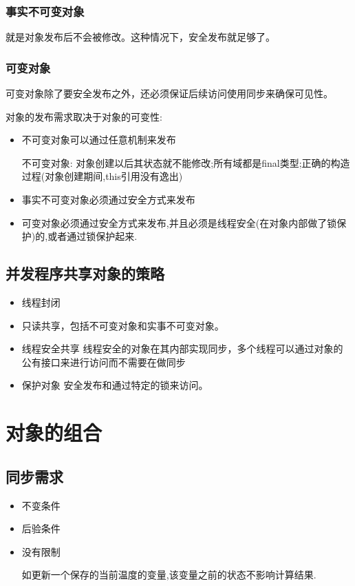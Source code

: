 \subsubsection{事实不可变对象}
就是对象发布后不会被修改。这种情况下，安全发布就足够了。

\subsubsection{可变对象}

可变对象除了要安全发布之外，还必须保证后续访问使用同步来确保可见性。

对象的发布需求取决于对象的可变性:
\begin{itemize}
\item 不可变对象可以通过任意机制来发布

不可变对象: 对象创建以后其状态就不能修改;所有域都是final类型;正确的构造过程(对象创建期间,this引用没有逸出)

\item 事实不可变对象必须通过安全方式来发布

\item 可变对象必须通过安全方式来发布,并且必须是线程安全(在对象内部做了锁保护)的,或者通过锁保护起来.
\end{itemize}

\subsection{并发程序共享对象的策略}
\begin{itemize}
\item 线程封闭
\item 只读共享，包括不可变对象和实事不可变对象。
\item 线程安全共享 线程安全的对象在其内部实现同步，多个线程可以通过对象的公有接口来进行访问而不需要在做同步
\item 保护对象 安全发布和通过特定的锁来访问。
\end{itemize}


\section{对象的组合}


\subsection{同步需求}

\begin{itemize}

\item 不变条件

\item 后验条件

\item 没有限制

如更新一个保存的当前温度的变量,该变量之前的状态不影响计算结果.

\end{itemize}


